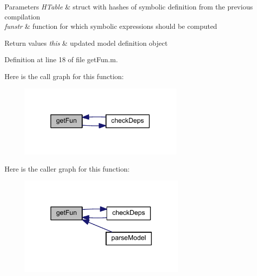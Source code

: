 \begin{DoxyParams}{Parameters}
{\em H\+Table} & struct with hashes of symbolic definition from the previous compilation \\
\hline
{\em funstr} & function for which symbolic expressions should be computed\\
\hline
\end{DoxyParams}

\begin{DoxyRetVals}{Return values}
{\em this} & updated model definition object \\
\hline
\end{DoxyRetVals}


Definition at line 18 of file get\+Fun.\+m.



Here is the call graph for this function\+:\nopagebreak
\begin{figure}[H]
\begin{center}
\leavevmode
\includegraphics[width=229pt]{classamimodel_a73f1b1b08350475e8d854d1a7f1944e1_cgraph}
\end{center}
\end{figure}




Here is the caller graph for this function\+:\nopagebreak
\begin{figure}[H]
\begin{center}
\leavevmode
\includegraphics[width=231pt]{classamimodel_a73f1b1b08350475e8d854d1a7f1944e1_icgraph}
\end{center}
\end{figure}


\hypertarget{classamimodel_a2728abfdded1f9cd0d956118c7d32005}{}

